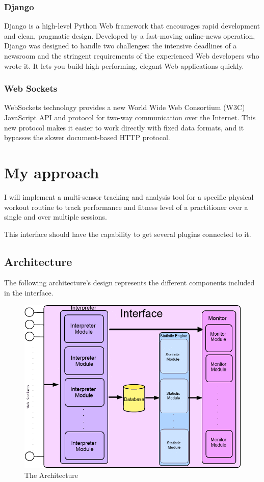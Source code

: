 \documentclass[a4paper]{article}
\begin{document}
\subsubsection{Django}
Django is a high-level Python Web framework that encourages rapid development and clean, pragmatic design. Developed by a fast-moving online-news operation, Django was designed to handle two challenges: the intensive deadlines of a newsroom and the stringent requirements of the experienced Web developers who wrote it. It lets you build high-performing, elegant Web applications quickly.

\subsubsection{Web Sockets}
WebSockets technology provides a new World Wide Web Consortium (W3C) JavaScript API and protocol for two-way communication over the Internet. This new protocol makes it easier to work directly with fixed data formats, and it bypasses the slower document-based HTTP protocol.

\section{My approach}
I will implement a multi-sensor tracking and analysis tool for a specific physical workout routine to track performance and fitness level of a practitioner over a single and over multiple sessions.

This interface should have the capability to get several plugins connected to it.

\subsection{Architecture}
The following architecture's design represents the different components included in the interface.
\newpage

\begin{figure}[h!]
\centering
\includegraphics[scale=0.6]{Interface.png}
\caption{The Architecture}
\label{threadsVsSync}
\end{figure}
\end{document}
